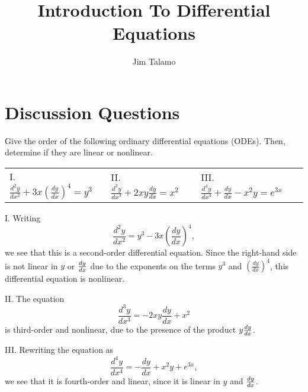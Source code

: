 \documentclass[noauthor, handout]{ximera}
\author{Jim Talamo}
\title{Introduction To Differential Equations}
\begin{document}
\begin{abstract}
\end{abstract}
\maketitle

\vspace{-0.9in}

\section{Discussion Questions}

\begin{problem} 

Give the order of the following ordinary differential equations (ODEs). Then, determine if they are linear or nonlinear.

\begin{tabular}{lll}
I. $\frac{d^2y}{dx^2}+3x \left(\frac{dy}{dx}\right)^4  = y^3$ \qquad & II. $\frac{d^3y}{dx^3} + 2xy\frac{dy}{dx} = x^2$  \qquad & III. $\frac{d^4y}{dx^4}+\frac{dy}{dx} -x^2y=e^{3x}$
\end{tabular}

\begin{freeResponse}
I. Writing 
$$
\frac{d^2y}{dx^2}  =  y^3 - 3x \left(\frac{dy}{dx}\right)^4,
$$
we see that this is a second-order differential equation. Since the right-hand side is not linear in $y$ or $\frac{\mathop{}\!d y}{\mathop{}\!d x}$ due to the exponents on the terms $y^3$ and $\left(\frac{dy}{dx}\right)^4$, this differential equation is nonlinear.

II. The equation
$$
\frac{d^3y}{dx^3} = - 2xy\frac{dy}{dx} + x^2
$$
is third-order and nonlinear, due to the presence of the product $y \frac{\mathop{}\!d y}{\mathop{}\!d x}$. 

III. Rewriting the equation as 
$$
\frac{d^4y}{dx^4} = -\frac{dy}{dx} + x^2y + e^{3x},
$$
we see that it is fourth-order and linear, since it is linear in $y$ and $\frac{\mathop{}\!d y}{\mathop{}\!d x}$. 
\end{freeResponse}
\end{problem}
\end{document}
